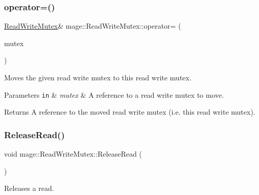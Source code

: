 \subsubsection{\texorpdfstring{operator=()}{operator=()}\hspace{0.1cm}{\footnotesize\ttfamily [2/2]}}
{\footnotesize\ttfamily \hyperlink{structmage_1_1_read_write_mutex}{Read\+Write\+Mutex}\& mage\+::\+Read\+Write\+Mutex\+::operator= (\begin{DoxyParamCaption}\item[{\hyperlink{structmage_1_1_read_write_mutex}{Read\+Write\+Mutex} \&\&}]{mutex }\end{DoxyParamCaption})\hspace{0.3cm}{\ttfamily [delete]}}

Moves the given read write mutex to this read write mutex.


\begin{DoxyParams}[1]{Parameters}
\mbox{\tt in}  & {\em mutex} & A reference to a read write mutex to move. \\
\hline
\end{DoxyParams}
\begin{DoxyReturn}{Returns}
A reference to the moved read write mutex (i.\+e. this read write mutex). 
\end{DoxyReturn}
\hypertarget{structmage_1_1_read_write_mutex_a0af5059a9bd16abd8a21b15e7ebe053d}{}\label{structmage_1_1_read_write_mutex_a0af5059a9bd16abd8a21b15e7ebe053d} 
\subsubsection{\texorpdfstring{Release\+Read()}{ReleaseRead()}}
{\footnotesize\ttfamily void mage\+::\+Read\+Write\+Mutex\+::\+Release\+Read (\begin{DoxyParamCaption}{ }\end{DoxyParamCaption})\hspace{0.3cm}{\ttfamily [private]}}

Releases a read. \hypertarget{structmage_1_1_read_write_mutex_ad0fd296bdaa212f54a58372c8dfe1d1d}{}\label{structmage_1_1_read_write_mutex_ad0fd296bdaa212f54a58372c8dfe1d1d} 
